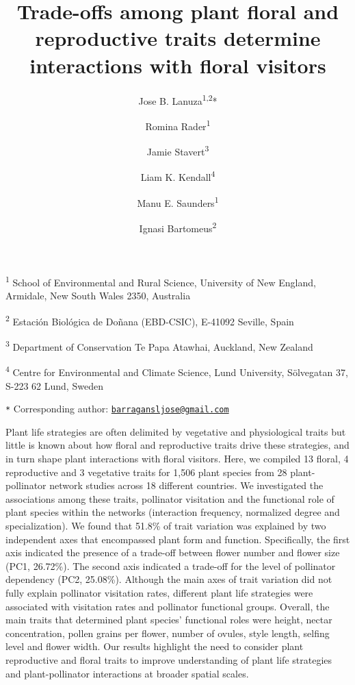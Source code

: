 \documentclass[12pt,a4paper,]{article}
\title{Trade-offs among plant floral and reproductive traits determine
interactions with floral visitors}
\author{Jose B. Lanuza\textsuperscript{1,2}* \and Romina Rader\textsuperscript{1} \and Jamie Stavert\textsuperscript{3} \and Liam K. Kendall\textsuperscript{4} \and Manu E. Saunders\textsuperscript{1} \and Ignasi Bartomeus\textsuperscript{2}}
\date{}
\begin{document}
\maketitle

\small

\textsuperscript{1} School of Environmental and Rural Science,
University of New England, Armidale, New South Wales 2350, Australia

\textsuperscript{2} Estación Biológica de Doñana (EBD-CSIC), E-41092
Seville, Spain

\textsuperscript{3} Department of Conservation \textbar{} Te Papa
Atawhai, Auckland, New Zealand

\textsuperscript{4} Centre for Environmental and Climate Science, Lund
University, Sölvegatan 37, S-223 62 Lund, Sweden

\texttt{*} Corresponding author:
\href{mailto:barragansljose@gmail.com}{\nolinkurl{barragansljose@gmail.com}}

\normalsize

Plant life strategies are often delimited by vegetative and
physiological traits but little is known about how floral and
reproductive traits drive these strategies, and in turn shape plant
interactions with floral visitors. Here, we compiled 13 floral, 4
reproductive and 3 vegetative traits for 1,506 plant species from 28
plant-pollinator network studies across 18 different countries. We
investigated the associations among these traits, pollinator visitation
and the functional role of plant species within the networks
(interaction frequency, normalized degree and specialization). We found
that 51.8\% of trait variation was explained by two independent axes
that encompassed plant form and function. Specifically, the first axis
indicated the presence of a trade-off between flower number and flower
size (PC1, 26.72\%). The second axis indicated a trade-off for the level
of pollinator dependency (PC2, 25.08\%). Although the main axes of trait
variation did not fully explain pollinator visitation rates, different
plant life strategies were associated with visitation rates and
pollinator functional groups. Overall, the main traits that determined
plant species' functional roles were height, nectar concentration,
pollen grains per flower, number of ovules, style length, selfing level
and flower width. Our results highlight the need to consider plant
reproductive and floral traits to improve understanding of plant life
strategies and plant-pollinator interactions at broader spatial scales.
\end{document}
